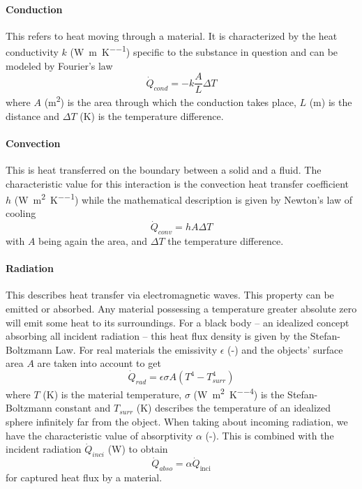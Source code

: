 \paragraph{Conduction} This refers to heat moving through a material.
It is characterized by the heat conductivity $k$ (\si{\W\per\m\per\K}) specific to the substance in question and can be modeled by Fourier's law
$$
\dot{Q}_{cond} = -k \frac{A}{L} \Delta T
$$
where $A$ (\si{\square\m}) is the area through which the conduction takes place, $L$ (\si{\m}) is the distance and $\Delta T$ (\si{\K}) is the temperature difference.

\paragraph{Convection} This is heat transferred on the boundary between a solid and a fluid.
The characteristic value for this interaction is the convection heat transfer coefficient $h$ (\si{\W\per\square\m\per\K}) while the mathematical description is given by Newton's law of cooling
$$
\dot{Q}_{conv} = h A \Delta T
$$
with $A$ being again the area, and $\Delta T$ the temperature difference.

\paragraph{Radiation} This describes heat transfer via electromagnetic waves.
This property can be emitted or absorbed.
Any material possessing a temperature greater absolute zero will emit some heat to its surroundings.
For a black body -- an idealized concept absorbing all incident radiation -- this heat flux density is given by the Stefan-Boltzmann Law.
For real materials the emissivity $\epsilon$ (-) and the objects' surface area $A$ are taken into account to get
$$
\dot{Q}_{rad} = \epsilon \sigma A (T^4 - T_{surr}^4)
$$
where $T$ (\si{\K}) is the material temperature, $\sigma$ (\si{\W\per\square\m\per\K\tothe{4}}) is the Stefan-Boltzmann constant and $T_{surr}$ (\si{\K}) describes the temperature of an idealized sphere infinitely far from the object.
When taking about incoming radiation, we have the characteristic value of absorptivity $\alpha$ (-).
This is combined with the incident radiation $\dot{Q}_{inci}$ (\si{\W}) to obtain 
$$
\dot{Q}_{abso} = \alpha \dot{Q}_{\text{inci}} 
$$
for captured heat flux by a material.




